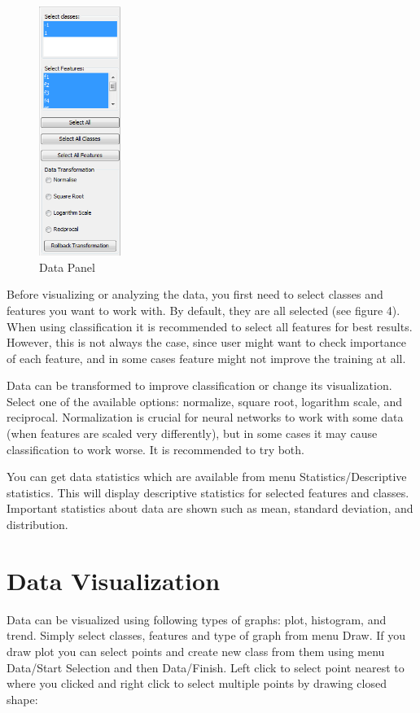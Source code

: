 \documentclass[a4paper,12pt,english]{report}
\begin{document}
\begin{figure} 
\begin{center}
\includegraphics[width = 75pt]{s3.png}
\end{center}
\caption{Data Panel}
\end{figure}

Before visualizing or analyzing the data, you first need to select classes and features you want to work with. By default, they are all selected (see figure 4). When using classification it is recommended to select all features for best results. However, this is not always the case, since user might want to check importance of each feature, and in some cases feature might not improve the training at all. 

Data can be transformed to improve classification or change its visualization. Select one of the available options: normalize, square root, logarithm scale, and reciprocal. Normalization is crucial for neural networks to work with some data (when features are scaled very differently), but in some cases it may cause classification to work worse. It is recommended to try both.

You can get data statistics which are available from menu Statistics/Descriptive statistics. This will display descriptive statistics for selected features and classes. Important statistics about data are shown such as mean, standard deviation,  and distribution.

\newpage
\section*{Data Visualization}

Data can be visualized using following types of graphs: plot, histogram, and trend. Simply select classes, features and type of graph from menu Draw. If you draw plot you can select points and create new class from them using menu Data/Start Selection and then Data/Finish. Left click to select point nearest to where you clicked and right click to select multiple points by drawing closed shape:
\end{document}

